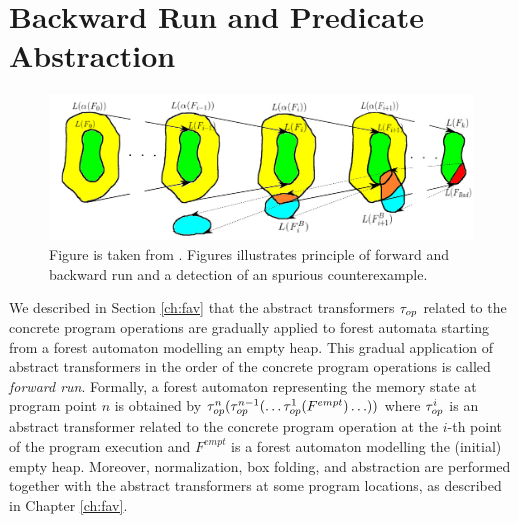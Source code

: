 \section{Backward Run and Predicate Abstraction}
\label{sec:br}

\begin{figure}[t]
	\centering
	\includegraphics[scale=0.3]{fig/artmc.png}
	\caption{
		Figure is taken from \cite{artmc}.
		Figures illustrates principle of forward and backward run and
		a detection of an spurious counterexample.}
	\label{fig:bwrun}
\end{figure}

We described in Section \ref{ch:fav} that the abstract transformers $\tau_{op}$
related to the concrete program operations are gradually applied to forest automata
starting from a forest automaton modelling an empty heap.
This gradual application of abstract transformers in the order of
the concrete program operations is called \emph{forward run}.
Formally, a forest automaton representing the memory state 
at program point $n$ is obtained by
$\tau_{op}^n(\tau_{op}^{n-1}(\ldots \tau_{op}^{1}(F^{empt}) \ldots))$
where $\tau_{op}^i$ is an abstract transformer related to the concrete
program operation at the $i$-th point of the program execution and
$F^{empt}$ is a forest automaton modelling the (initial) empty heap.
Moreover, normalization, box folding, and abstraction are performed
together with the abstract transformers at some program locations,
as described in Chapter \ref{ch:fav}.

